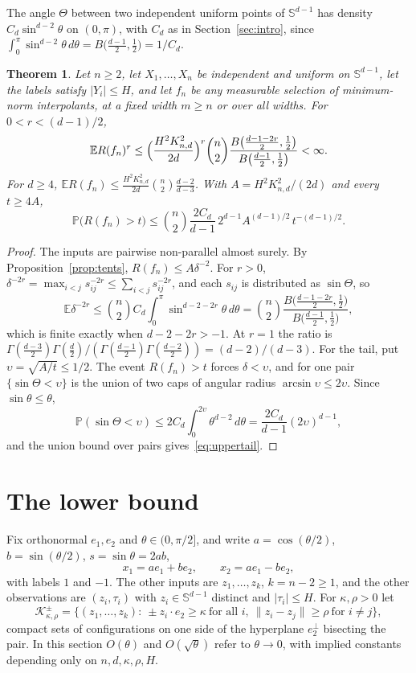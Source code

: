 \documentclass[11pt]{amsart}
\newtheorem{theorem}{Theorem}[section]
\theoremstyle{remark}
\numberwithin{equation}{section}
\newcommand{\EE}{\mathbb{E}}
\newcommand{\PP}{\mathbb{P}}
\newcommand{\Sph}{\mathbb{S}^{d-1}}
\begin{document}
The angle $\Theta$ between two independent uniform points of $\Sph$ has density $C_d\sin^{d-2}\theta$ on $(0,\pi)$, with $C_d$ as in Section~\ref{sec:intro}, since $\int_0^\pi\sin^{d-2}\theta\,d\theta=B\bigl(\tfrac{d-1}2,\tfrac12\bigr)=1/C_d$.

\begin{theorem}\label{thm:upper}
Let $n\ge2$, let $X_1,\dots,X_n$ be independent and uniform on $\Sph$, let the labels satisfy $|Y_i|\le H$, and let $f_n$ be any measurable selection of minimum-norm interpolants, at a fixed width $m\ge n$ or over all widths. For $0<r<(d-1)/2$,
\begin{equation}\label{eq:moment}
\EE R(f_n)^r\le\Bigl(\frac{H^2K_{n,d}^2}{2d}\Bigr)^{r}\binom n2\frac{B\bigl(\tfrac{d-1-2r}2,\tfrac12\bigr)}{B\bigl(\tfrac{d-1}2,\tfrac12\bigr)}<\infty .
\end{equation}
For $d\ge4$, $\EE R(f_n)\le\frac{H^2K_{n,d}^2}{2d}\binom n2\frac{d-2}{d-3}$. With $A=H^2K_{n,d}^2/(2d)$ and every $t\ge4A$,
\begin{equation}\label{eq:uppertail}
\PP\bigl(R(f_n)>t\bigr)\le\binom n2\frac{2C_d}{d-1}\,2^{d-1}A^{(d-1)/2}\,t^{-(d-1)/2}.
\end{equation}
\end{theorem}
\begin{proof}
The inputs are pairwise non-parallel almost surely. By Proposition~\ref{prop:tents}, $R(f_n)\le A\delta^{-2}$. For $r>0$, $\delta^{-2r}=\max_{i<j}s_{ij}^{-2r}\le\sum_{i<j}s_{ij}^{-2r}$, and each $s_{ij}$ is distributed as $\sin\Theta$, so
\[
\EE\delta^{-2r}\le\binom n2C_d\int_0^\pi\sin^{d-2-2r}\theta\,d\theta=\binom n2\frac{B\bigl(\tfrac{d-1-2r}2,\tfrac12\bigr)}{B\bigl(\tfrac{d-1}2,\tfrac12\bigr)},
\]
which is finite exactly when $d-2-2r>-1$. At $r=1$ the ratio is $\Gamma(\frac{d-3}2)\Gamma(\frac d2)/(\Gamma(\frac{d-1}2)\Gamma(\frac{d-2}2))=(d-2)/(d-3)$. For the tail, put $\upsilon=\sqrt{A/t}\le1/2$. The event $R(f_n)>t$ forces $\delta<\upsilon$, and for one pair $\{\sin\Theta<\upsilon\}$ is the union of two caps of angular radius $\arcsin\upsilon\le2\upsilon$. Since $\sin\theta\le\theta$,
\[
\PP(\sin\Theta<\upsilon)\le2C_d\int_0^{2\upsilon}\theta^{d-2}\,d\theta=\frac{2C_d}{d-1}(2\upsilon)^{d-1},
\]
and the union bound over pairs gives~\eqref{eq:uppertail}.
\end{proof}

\section{The lower bound}\label{sec:lower}
Fix orthonormal $e_1,e_2$ and $\theta\in(0,\pi/2]$, and write $a=\cos(\theta/2)$, $b=\sin(\theta/2)$, $s=\sin\theta=2ab$,
\[
x_1=ae_1+be_2,\qquad x_2=ae_1-be_2,
\]
with labels $1$ and $-1$. The other inputs are $z_1,\dots,z_k$, $k=n-2\ge1$, and the other observations are $(z_i,\tau_i)$ with $z_i\in\Sph$ distinct and $|\tau_i|\le H$. For $\kappa,\rho>0$ let
\[
\mathcal K^{\pm}_{\kappa,\rho}=\bigl\{(z_1,\dots,z_k):\ \pm z_i\cdot e_2\ge\kappa\ \text{for all }i,\ \|z_i-z_j\|\ge\rho\ \text{for }i\ne j\bigr\},
\]
compact sets of configurations on one side of the hyperplane $e_2^\perp$ bisecting the pair. In this section $O(\theta)$ and $O(\sqrt\theta)$ refer to $\theta\to0$, with implied constants depending only on $n,d,\kappa,\rho,H$.
\end{document}
